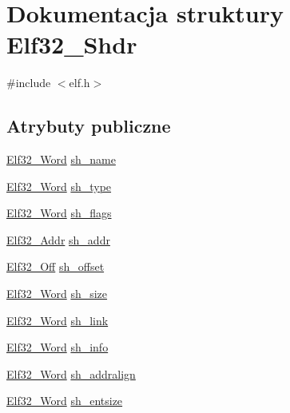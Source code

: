 \hypertarget{struct_elf32___shdr}{\section{Dokumentacja struktury Elf32\-\_\-\-Shdr}
\label{struct_elf32___shdr}
}


{\ttfamily \#include $<$elf.\-h$>$}

\subsection*{Atrybuty publiczne}
\begin{DoxyCompactItemize}
\item 
\hyperlink{elf_8h_af5924ece606c732e86f8263a19408e45}{Elf32\-\_\-\-Word} \hyperlink{struct_elf32___shdr_a6e8fd300ca473a31d0f65817ce371dfd}{sh\-\_\-name}
\item 
\hyperlink{elf_8h_af5924ece606c732e86f8263a19408e45}{Elf32\-\_\-\-Word} \hyperlink{struct_elf32___shdr_aab6c221dbd7e16987df41280fb915408}{sh\-\_\-type}
\item 
\hyperlink{elf_8h_af5924ece606c732e86f8263a19408e45}{Elf32\-\_\-\-Word} \hyperlink{struct_elf32___shdr_a27e003d8da37de3038a0065577a7743d}{sh\-\_\-flags}
\item 
\hyperlink{elf_8h_a40c6d4571e6001f443cc6a6474620158}{Elf32\-\_\-\-Addr} \hyperlink{struct_elf32___shdr_a7e668a62cee74a2f9c6edabb5f45635a}{sh\-\_\-addr}
\item 
\hyperlink{elf_8h_a655751f9b317369b93c581ea8ed84516}{Elf32\-\_\-\-Off} \hyperlink{struct_elf32___shdr_a6e37227a5777cddc0a9dbbb3c2598ec1}{sh\-\_\-offset}
\item 
\hyperlink{elf_8h_af5924ece606c732e86f8263a19408e45}{Elf32\-\_\-\-Word} \hyperlink{struct_elf32___shdr_a84dc67bb0ab65880bbcd74fbee722ff1}{sh\-\_\-size}
\item 
\hyperlink{elf_8h_af5924ece606c732e86f8263a19408e45}{Elf32\-\_\-\-Word} \hyperlink{struct_elf32___shdr_ad759308388eb14c5c6e4d636c38999da}{sh\-\_\-link}
\item 
\hyperlink{elf_8h_af5924ece606c732e86f8263a19408e45}{Elf32\-\_\-\-Word} \hyperlink{struct_elf32___shdr_aef63fe62c2c9927f374c4f987954c6e5}{sh\-\_\-info}
\item 
\hyperlink{elf_8h_af5924ece606c732e86f8263a19408e45}{Elf32\-\_\-\-Word} \hyperlink{struct_elf32___shdr_a399f50b3591e6286d4ad819f790979ed}{sh\-\_\-addralign}
\item 
\hyperlink{elf_8h_af5924ece606c732e86f8263a19408e45}{Elf32\-\_\-\-Word} \hyperlink{struct_elf32___shdr_a10c59cecc928aae27930601fe545d3ca}{sh\-\_\-entsize}
\end{DoxyCompactItemize}


